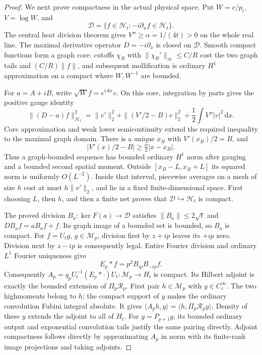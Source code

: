 \documentclass[11pt]{article}
\theoremstyle{remark}\newtheorem{remark}[theorem]{Remark}
\newcommand{\dd}{\,\mathrm d}
\begin{document}
\begin{proof}
We next prove compactness in the actual physical space.
Put \(W=c/p_t\), \(V=\log W\), and
\[
 \mathcal D=\{f\in\mathcal H_t:
                         -i\partial_xf\in\mathcal H_t\}.
\]
The central heat division theorem gives
\(V''\ge\alpha=1/(4t)>0\) on the whole real line.
The maximal derivative operator \(D=-i\partial_x\) is closed on
\(\mathcal D\). Smooth compact functions form a graph core:
cutoffs \(\chi_R\) with \(\|\chi_R'\|_\infty\le C/R\) cost the
two graph tails and \((C/R)\|f\|\), and subsequent mollification is
ordinary \(H^1\) approximation on a compact where \(W,W^{-1}\) are
bounded.

For \(a=A+iB\), write \(\sqrt W f=e^{iAx}v\). On this core,
integration by parts gives the positive gauge identity
\[
 \|(D-a)f\|_{\mathcal H_t}^2
    =\|v'\|_2^2+\|(V'/2-B)v\|_2^2
                                  +\frac12\int V''|v|^2\dd x.
                                                        \tag{CAS17}
\]
Core approximation and weak lower semicontinuity extend the
required inequality to the maximal graph domain.
There is a unique \(x_B\) with \(V'(x_B)/2=B\), and
\[
 |V'(x)/2-B|\ge\tfrac\alpha2|x-x_B|.
\]
Thus a graph-bounded sequence has bounded ordinary \(H^1\) norm
after gauging and a bounded second spatial moment.
Outside \([x_B-L,x_B+L]\) its squared norm is uniformly \(O(L^{-2})\).
Inside that interval, piecewise averages on a mesh of size \(h\)
cost at most \(h\|v'\|_2\), and lie in a fixed finite-dimensional
space. First choosing \(L\), then \(h\), and then a finite net proves
that \(\mathcal D\hookrightarrow\mathcal H_t\) is compact.

The proved division
\(B_a:\ker F(a)\to\mathcal D\) satisfies
\(\|B_a\|\le2\sqrt t\) and \(DB_af=aB_af+f\).
Its graph image of a bounded set is bounded, so \(B_a\) is compact.
For \(f=U_tg\), \(g\in\mathcal M_p\), division first by \(z+ip\)
leaves its \(+ip\) zero. Division next by \(z-ip\) is consequently
legal. Entire Fourier division and ordinary \(L^1\) Fourier
uniqueness give
\[
 E_p*f=p^2B_{ip}B_{-ip}f.                               \tag{CAS18}
\]
Consequently \(A_p=q_pU_t^{-1}(E_p*\cdot)U_t:
\mathcal M_p\to H_t\) is compact. Its Hilbert adjoint is exactly
the bounded extension of \(\Pi_p\mathcal R_p\).
First pair \(h\in\mathcal M_p\) with \(y\in C_c^\infty\).
The two highmoments belong to \(h\); the compact support of \(y\)
makes the ordinary convolution Fubini integral absolute. It gives
\(\langle A_ph,y\rangle=\langle h,\Pi_p\mathcal R_py\rangle\).
Density of these \(y\) extends the adjoint to all of \(H_t\).
For \(y=P_{p+1}g\), its bounded ordinary output and exponential
convolution tails justify the same pairing directly.
Adjoint compactness follows directly by approximating
\(A_p\) in norm with its finite-rank image projections and taking
adjoints.


\end{proof}
\end{document}
